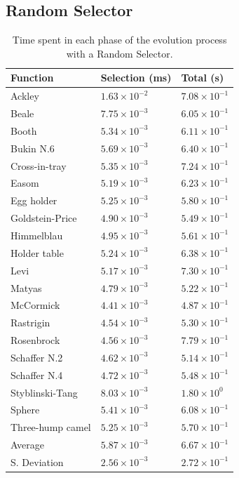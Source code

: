   \subsection{Random Selector}
      \centering
      \begin{longtable}{|l|l|l|}
        \caption{
          Time spent in each phase of the evolution process with a Random Selector.
        }\\
        \hline
        Function        & Selection (ms)        & Total (s) \\
        \hline\hline
        Ackley	          & $1.63 \times 10^{-2}$	& $7.08 \times 10^{-1}$	\\\hline
        Beale	            & $7.75 \times 10^{-3}$	& $6.05 \times 10^{-1}$	\\\hline
        Booth         	  & $5.34 \times 10^{-3}$	& $6.11 \times 10^{-1}$	\\\hline
        Bukin N.6	        & $5.69 \times 10^{-3}$	& $6.40 \times 10^{-1}$	\\\hline
        Cross-in-tray	    & $5.35 \times 10^{-3}$	& $7.24 \times 10^{-1}$	\\\hline
        Easom	            & $5.19 \times 10^{-3}$	& $6.23 \times 10^{-1}$	\\\hline
        Egg holder	      & $5.25 \times 10^{-3}$	& $5.80 \times 10^{-1}$	\\\hline
        Goldstein-Price	  & $4.90 \times 10^{-3}$	& $5.49 \times 10^{-1}$	\\\hline
        Himmelblau	      & $4.95 \times 10^{-3}$	& $5.61 \times 10^{-1}$	\\\hline
        Holder table	    & $5.24 \times 10^{-3}$	& $6.38 \times 10^{-1}$	\\\hline
        Levi	            & $5.17 \times 10^{-3}$	& $7.30 \times 10^{-1}$	\\\hline
        Matyas	          & $4.79 \times 10^{-3}$	& $5.22 \times 10^{-1}$	\\\hline
        McCormick	        & $4.41 \times 10^{-3}$	& $4.87 \times 10^{-1}$	\\\hline
        Rastrigin	        & $4.54 \times 10^{-3}$	& $5.30 \times 10^{-1}$	\\\hline
        Rosenbrock	      & $4.56 \times 10^{-3}$	& $7.79 \times 10^{-1}$	\\\hline
        Schaffer N.2	    & $4.62 \times 10^{-3}$	& $5.14 \times 10^{-1}$	\\\hline
        Schaffer N.4	    & $4.72 \times 10^{-3}$	& $5.48 \times 10^{-1}$	\\\hline
        Styblinski-Tang   & $8.03 \times 10^{-3}$	& $1.80 \times 10^{0}$	\\\hline
        Sphere	          & $5.41 \times 10^{-3}$	& $6.08 \times 10^{-1}$	\\\hline
        Three-hump camel  & $5.25 \times 10^{-3}$	& $5.70 \times 10^{-1}$	\\\hline
        \hline Average	  & $5.87 \times 10^{-3}$	& $6.67 \times 10^{-1}$ \\\hline
        S. Deviation	    & $2.56 \times 10^{-3}$	& $2.72 \times 10^{-1}$ \\\hline
      \end{longtable}

